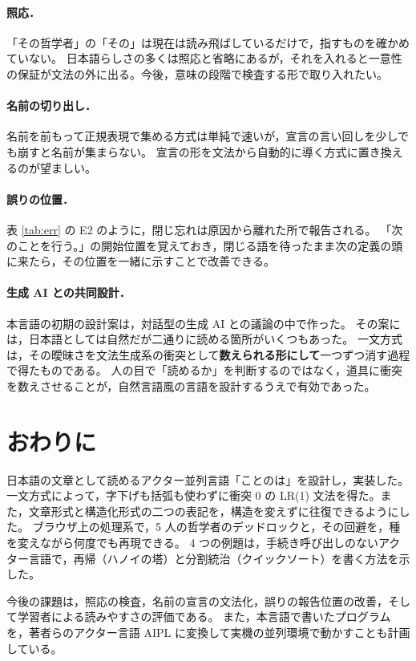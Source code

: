 \documentclass[a4paper,10pt]{ltjsarticle}
\begin{document}
\paragraph{照応．}
「その哲学者」の「その」は現在は読み飛ばしているだけで，指すものを確かめていない。
日本語らしさの多くは照応と省略にあるが，それを入れると一意性の保証が文法の外に出る。今後，意味の段階で検査する形で取り入れたい。

\paragraph{名前の切り出し．}
名前を前もって正規表現で集める方式は単純で速いが，宣言の言い回しを少しでも崩すと名前が集まらない。
宣言の形を文法から自動的に導く方式に置き換えるのが望ましい。

\paragraph{誤りの位置．}
表 \ref{tab:err} の E2 のように，閉じ忘れは原因から離れた所で報告される。
「次のことを行う。」の開始位置を覚えておき，閉じる語を待ったまま次の定義の頭に来たら，その位置を一緒に示すことで改善できる。

\paragraph{生成 AI との共同設計．}
本言語の初期の設計案は，対話型の生成 AI との議論の中で作った。
その案には，日本語としては自然だが二通りに読める箇所がいくつもあった。
一文方式は，その曖昧さを文法生成系の衝突として\textbf{数えられる形にして}一つずつ消す過程で得たものである。
人の目で「読めるか」を判断するのではなく，道具に衝突を数えさせることが，自然言語風の言語を設計するうえで有効であった。

\section{おわりに}

日本語の文章として読めるアクター並列言語「ことのは」を設計し，実装した。
一文方式によって，字下げも括弧も使わずに衝突 0 の LR(1) 文法を得た。また，文章形式と構造化形式の二つの表記を，構造を変えずに往復できるようにした。
ブラウザ上の処理系で，5 人の哲学者のデッドロックと，その回避を，種を変えながら何度でも再現できる。
4 つの例題は，手続き呼び出しのないアクター言語で，再帰（ハノイの塔）と分割統治（クイックソート）を書く方法を示した。

今後の課題は，照応の検査，名前の宣言の文法化，誤りの報告位置の改善，そして学習者による読みやすさの評価である。
また，本言語で書いたプログラムを，著者らのアクター言語 AIPL \cite{aipl} に変換して実機の並列環境で動かすことも計画している。
\end{document}
